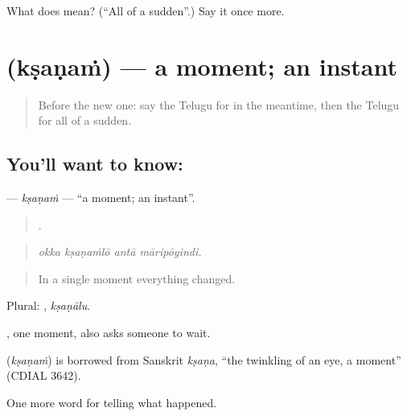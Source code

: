 \begin{tcolorbox}[breakable,colback=teal!4,colframe=teal!35!black,title={Before you move on}]
What does  mean? (\textquotedblleft{}All of a sudden\textquotedblright{}.) Say it once more.
\end{tcolorbox}
\section[\texorpdfstring{\te{క్షణం} (kṣaṇaṁ)}{క్షణం (kṣaṇaṁ)}]{ (kṣaṇaṁ) — a moment; an instant}

\label{lesson:TE-C332-ksanam}



\begin{quote}
Before the new one: say the Telugu for in the meantime, then the Telugu for all of a sudden.
\end{quote}

\subsection*{You'll want to know: }
\textbf{} — \emph{kṣaṇaṁ} — \textquotedblleft{}a moment; an instant\textquotedblright{}.

\begin{quote}
   .
\end{quote}

\begin{quote}
\emph{okka kṣaṇaṁlō antā māripōyindi.}
\end{quote}

\begin{quote}
In a single moment everything changed.
\end{quote}

Plural: , \emph{kṣaṇālu}.

 , one moment, also asks someone to wait.

\begin{cousinweb}
\textbf{} (\emph{kṣaṇaṁ}) is borrowed from Sanskrit \emph{kṣaṇa}, \textquotedblleft{}the twinkling of an eye, a moment\textquotedblright{} (CDIAL 3642).
\end{cousinweb}

\begin{grammarlens}[title={What you've built}]
One more word for telling what happened.
\end{grammarlens}

